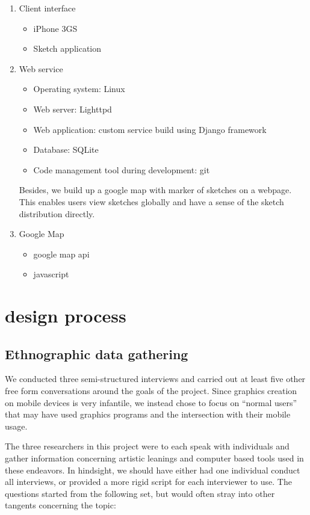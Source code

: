 \documentclass{chi2009}
\begin{document}
\begin{enumerate}
\item Client interface
        \begin{itemize}
        \item iPhone 3GS
        \item  Sketch application
        \end{itemize}

\item Web service
        \begin{itemize}
        \item Operating system: Linux
        \item Web server: Lighttpd
        \item Web application: custom service build using Django framework
        \item Database: SQLite
        \item Code management tool during development: git
        \end{itemize}


Besides, we build up a google map with marker of sketches on a webpage. This enables users view  sketches globally and have a sense of the sketch distribution directly.
\item Google Map
   \begin{itemize}
   \item google map api
   \item javascript
   \end{itemize}
   \end{enumerate}


\section{design process}

\subsection{Ethnographic data gathering}
We conducted three semi-structured interviews and carried out at least five
other free form conversations around the goals of the project.  Since graphics
creation on mobile devices is very infantile, we instead chose to focus on
``normal users'' that may have used graphics programs and the intersection with
their mobile usage.

The three researchers in this project were to each speak with individuals and
gather information concerning artistic leanings and computer based tools used
in these endeavors.  In hindsight, we should have either had one individual
conduct all interviews, or provided a more rigid script for each interviewer to
use.  The questions started from the following set, but would often stray into
other tangents concerning the topic:
\end{document}
